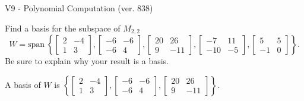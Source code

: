 \begin{exercise}
  \begin{exerciseTitle}V9 - Polynomial Computation (ver. 838)\end{exerciseTitle}
  \begin{exerciseStatement}
    Find a basis for the subspace of \(M_{2,2}\) 
\[W=\mathrm{span}\ \left\{\left[\begin{array}{cc}
2 & -4 \\
1 & 3
\end{array}\right] , \left[\begin{array}{cc}
-6 & -6 \\
-6 & 4
\end{array}\right] , \left[\begin{array}{cc}
20 & 26 \\
9 & -11
\end{array}\right] , \left[\begin{array}{cc}
-7 & 11 \\
-10 & -5
\end{array}\right] , \left[\begin{array}{cc}
5 & 5 \\
-1 & 0
\end{array}\right]\right\}.\]
 Be sure to explain why your result is a basis.


  \end{exerciseStatement}
  \begin{exerciseAnswer}
   A basis of \(W\) is  \(\left\{\left[\begin{array}{cc}
2 & -4 \\
1 & 3
\end{array}\right] , \left[\begin{array}{cc}
-6 & -6 \\
-6 & 4
\end{array}\right] , \left[\begin{array}{cc}
20 & 26 \\
9 & -11
\end{array}\right]\right\}\).
  


  \end{exerciseAnswer}
\end{exercise}